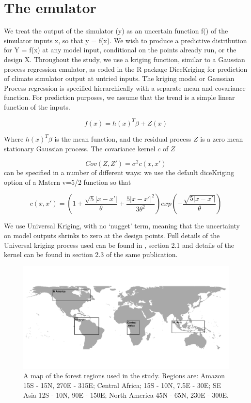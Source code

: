 \documentclass[esd, manuscript]{copernicus} %
\begin{document}
\section{The emulator}

We treat the output of the simulator (y) as an uncertain function f() of the simulator inputs x, so that y = f(x). We wish to produce a predictive distribution for Y = f(x) at any model input, conditional on the points already run, or the design X. Throughout the study, we use a kriging function, similar to a Gaussian process regression emulator, as coded in the R package DiceKriging \citep{roustant2012dicekriging} for prediction of climate simulator output at untried inputs.
The kriging model or Gaussian Process regression is specified hierarchically with a separate mean and covariance function. For prediction purposes, we assume that the trend is a simple linear function of the inputs. 

$$
f(x) = h(x)^T \beta + Z(x)
$$

Where $h(x)^T \beta$ is the mean function, and the residual process $Z$ is a zero mean stationary Gaussian process. The covariance kernel $c$ of $Z$ 

$$
Cov(Z, Z') = \sigma^2 c(x,x')
$$
can be specified in a number of different ways: we use the default diceKriging option of a Matern v=5/2 function so that

$$
c(x,x') = (1 + \frac{\sqrt{5} | x - x'|}{\theta} + \frac{5 | x - x'|^2}{3 \theta^2})exp(- \frac{\sqrt{5 |x-x'|}}{\theta})
$$

We use Universal Kriging, with no `nugget' term, meaning that the uncertainty on model outputs shrinks to zero at the design points. Full details of the Universal kriging process used can be found in \citep{roustant2012dicekriging}, section 2.1 and details of the kernel can be found in section 2.3 of the same publication. 



\begin{figure}[t]
\includegraphics[width=12cm]{graphics/map_forests.pdf}
\caption{A map of the forest regions used in the study. Regions are: Amazon 15\textdegree S - 15\textdegree N, 270\textdegree E - 315\textdegree E; Central Africa; 15\textdegree S - 10\textdegree N, 7.5\textdegree E - 30\textdegree E; SE Asia 12\textdegree S - 10\textdegree N, 90\textdegree E - 150\textdegree E; North America 45\textdegree N - 65\textdegree N, 230\textdegree E - 300\textdegree E.}
\label{fig:map_forests}
\end{figure}
\end{document}
